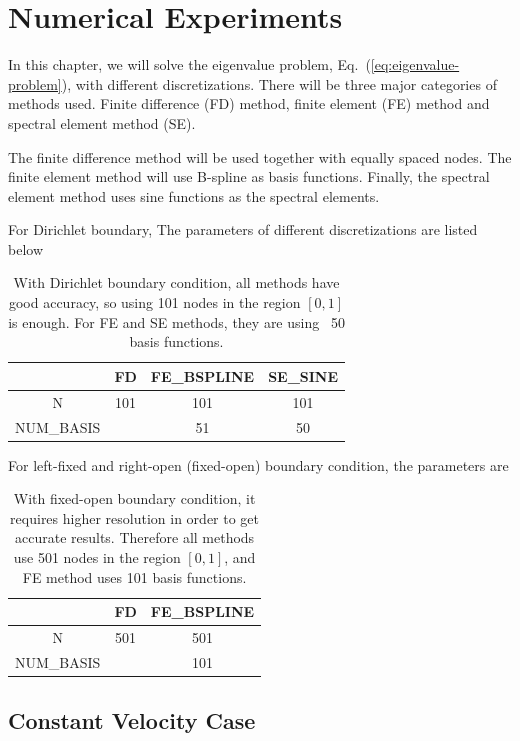 \chapter{Numerical Experiments} \label{chap:numerical-experiments}
In this chapter, we will solve the eigenvalue problem, Eq.~(\ref{eq:eigenvalue-problem}), with different discretizations. There will be three major categories of methods used. Finite difference (FD) method, finite element (FE) method and spectral element method (SE).

The finite difference method will be used together with equally spaced nodes. The finite element method will use B-spline as basis functions. Finally, the spectral element method uses sine functions as the spectral elements.

For Dirichlet boundary, The parameters of different discretizations are listed below
\begin{table} [H]
	\centering
	\caption{With Dirichlet boundary condition, all methods have good accuracy, so using 101 nodes in the region $[0,1]$ is enough. For FE and SE methods, they are using ~50 basis functions.}
	\begin{tabular}{|c|c|c|c|}
		\hline
		           & FD  & FE\_BSPLINE & SE\_SINE \\
		\hline
		N          & 101 & 101         & 101      \\
		\hline
		NUM\_BASIS &     & 51          & 50       \\
		\hline
	\end{tabular}
	\label{table:parameters-dirichlet}
\end{table}

For left-fixed and right-open (fixed-open) boundary condition, the parameters are
\begin{table} [H]
	\centering
	\caption{With fixed-open boundary condition, it requires higher resolution in order to get accurate results. Therefore all methods use 501 nodes in the region $[0,1]$, and FE method uses 101 basis functions.}
	\begin{tabular}{|c|c|c|}
		\hline
		           & FD  & FE\_BSPLINE \\
		\hline
		N          & 501 & 501         \\
		\hline
		NUM\_BASIS &     & 101         \\
		\hline
	\end{tabular}
	\label{table:parameters-fixed-open}
\end{table}


\section{Constant Velocity Case}

